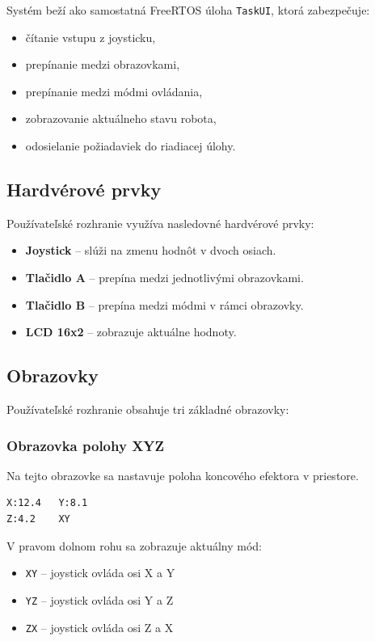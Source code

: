 Systém beží ako samostatná FreeRTOS úloha \texttt{TaskUI}, ktorá zabezpečuje:
\begin{itemize}
    \item čítanie vstupu z joysticku,
    \item prepínanie medzi obrazovkami,
    \item prepínanie medzi módmi ovládania,
    \item zobrazovanie aktuálneho stavu robota,
    \item odosielanie požiadaviek do riadiacej úlohy.
\end{itemize}

\subsection{Hardvérové prvky}

Používateľské rozhranie využíva nasledovné hardvérové prvky:
\begin{itemize}
    \item \textbf{Joystick} -- slúži na zmenu hodnôt v dvoch osiach.
    \item \textbf{Tlačidlo A} -- prepína medzi jednotlivými obrazovkami.
    \item \textbf{Tlačidlo B} -- prepína medzi módmi v rámci obrazovky.
    \item \textbf{LCD 16x2} -- zobrazuje aktuálne hodnoty.
\end{itemize}

\subsection{Obrazovky}

Používateľské rozhranie obsahuje tri základné obrazovky:

\subsubsection{Obrazovka polohy XYZ}

Na tejto obrazovke sa nastavuje poloha koncového efektora v priestore.

\begin{lstlisting}[caption={Ukážka obrazovky XYZ}]
X:12.4   Y:8.1
Z:4.2    XY
\end{lstlisting}

V pravom dolnom rohu sa zobrazuje aktuálny mód:

\begin{itemize}
    \item \texttt{XY} -- joystick ovláda osi X a Y
    \item \texttt{YZ} -- joystick ovláda osi Y a Z
    \item \texttt{ZX} -- joystick ovláda osi Z a X
\end{itemize}

